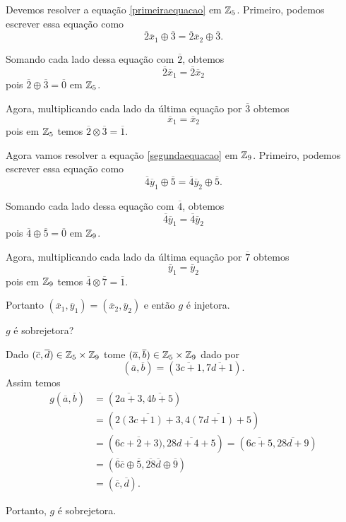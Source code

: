 \documentclass[12pt]{exam}
\begin{document}
    Devemos resolver a equação \eqref{primeiraequacao} em $\mathbb{Z}_5$. Primeiro, podemos escrever essa equação como
    \[
        \overline{2}\overline{x}_1 \oplus \overline{3} = \overline{2}\overline{x}_2 \oplus \overline{3}.
    \]

    Somando cada lado dessa equação com $\overline{2}$, obtemos
    \[
        \overline{2}\overline{x}_1 = \overline{2}\overline{x}_2
    \]
    pois $\overline{2} \oplus \overline{3} = \overline{0}$ em $\mathbb{Z}_5$.


    Agora, multiplicando cada lado da última equação por $\overline{3}$ obtemos
    \[
        \overline{x}_1 = \overline{x}_2
    \]
    pois em $\mathbb{Z}_5$ temos $\overline{2} \otimes \overline{3} = \overline{1}$.

    Agora vamos resolver a equação \eqref{segundaequacao} em $\mathbb{Z}_9$. Primeiro, podemos escrever essa equação como
    \[
        \overline{4}\overline{y}_1 \oplus \overline{5} = \overline{4}\overline{y}_2 \oplus \overline{5}.
    \]

    Somando cada lado dessa equação com $\overline{4}$, obtemos
    \[
        \overline{4}\overline{y}_1 = \overline{4}\overline{y}_2
    \]
    pois $\overline{4} \oplus \overline{5} = \overline{0}$ em $\mathbb{Z}_9$.


    Agora, multiplicando cada lado da última equação por $\overline{7}$ obtemos
    \[
        \overline{y}_1 = \overline{y}_2
    \]
    pois em $\mathbb{Z}_9$ temos $\overline{4} \otimes \overline{7} = \overline{1}$.

    Portanto $(\overline{x}_1, \overline{y}_1) = (\overline{x}_2, \overline{y}_2)$ e então $g$ é injetora.

    \vspace{1cm}
    \questao $g$ é sobrejetora?

    \solucao Dado $(\overline{c}, \overline{d}) \in \mathbb{Z}_5 \times \mathbb{Z}_9$ tome $(\overline{a}, \overline{b}) \in  \mathbb{Z}_5 \times \mathbb{Z}_9$ dado por
    \[
        (\overline{a}, \overline{b}) = (\overline{3c + 1}, \overline{7d + 1}).
    \]
    Assim temos
    \begin{align*}
        g(\overline{a}, \overline{b}) &= (\overline{2a + 3}, \overline{4b + 5}) \\ &= (\overline{2(3c + 1) + 3}, \overline{4(7d + 1) + 5})\\ &= (\overline{6c + 2 + 3)}, \overline{28d + 4 + 5}) = (\overline{6c + 5}, \overline{28d + 9})\\ &= (\overline{6}\overline{c} \oplus \overline{5}, \overline{28}\overline{d} \oplus \overline{9})\\ &= (\overline{c}, \overline{d}).
    \end{align*}

    Portanto, $g$ é sobrejetora.
\vspace{1cm}
\end{document}
